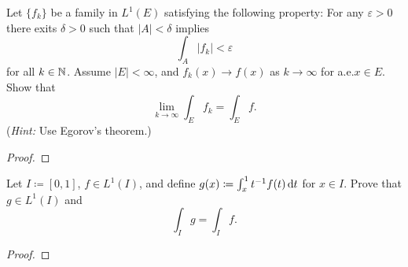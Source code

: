 \begin{problem}
Let $\{f_k\}$ be a family in $L^1(E)$ satisfying the following property:
For any $\varepsilon>0$ there exits $\delta>0$ such that $|A|<\delta$
implies
\[
\int_A |f_k|<\varepsilon
\]
for all $k\in\mathbb{N}$. Assume $|E|<\infty$, and $f_k(x)\to f(x)$ as
$k\to\infty$ for a.e.\@ $x\in E$. Show that
\[
\lim_{k\to\infty}\int_E f_k=\int_E f.
\]
(\emph{Hint:} Use Egorov's theorem.)
\end{problem}
\begin{proof}
\end{proof}

\begin{problem}
Let $I\coloneqq[0,1]$, $f\in L^1(I)$, and define $g(x)\coloneqq\int_x^1
t^{-1}f(t)\mathop{}\!\mathrm{d} t$ for $x\in I$. Prove that $g\in L^1(I)$ and
\[
\int_I g=\int_I f.
\]
\end{problem}
\begin{proof}
\end{proof}

